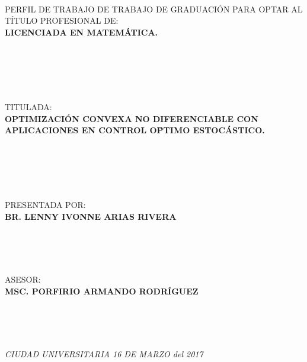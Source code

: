 \documentclass[]{../Configuraciones/documentos}
\begin{document}
\encabezado

~\\ \bigskip ~\\ \bigskip ~ \\

\begin{center}
PERFIL DE TRABAJO DE TRABAJO DE GRADUACI\'ON PARA OPTAR AL T\'ITULO PROFESIONAL DE:\\

{\bf LICENCIADA EN MATEM\'ATICA.}
\end{center} ~ \\ \\ \\
\ 

\begin{center}
TITULADA:\\

{\bf OPTIMIZACI\'ON CONVEXA NO DIFERENCIABLE CON APLICACIONES EN CONTROL O\'PTIMO ESTOC\'ASTICO.}
\end{center} ~ \\ \\ \\
\

\begin{center}
PRESENTADA POR:\\

{\bf BR. LENNY IVONNE ARIAS RIVERA}
\end{center} ~ \\ \\ \\

\begin{center}
   ASESOR:\\
   {\bf MSC. PORFIRIO ARMANDO RODR\'IGUEZ}
\end{center}~ \\ \\ \\

\begin{center}
   {\it CIUDAD UNIVERSITARIA 16 DE MARZO del 2017}
\end{center}







% 
% 
% 
\end{document}
